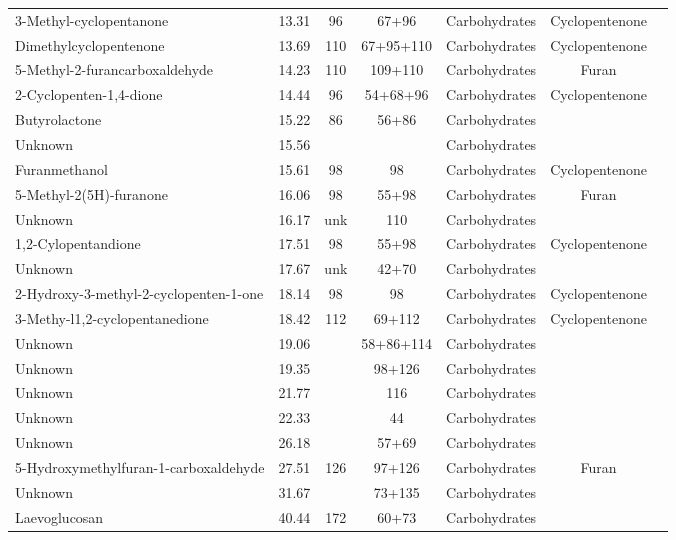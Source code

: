 \begin{table}[h!]
\begin{center}
{\begin{tabular}{lcccccc}
3-Methyl-cyclopentanone & 13.31 & 96 & 67+96 &Carbohydrates&Cyclopentenone\\ 
Dimethylcyclopentenone & 13.69 & 110 & 67+95+110 &Carbohydrates&Cyclopentenone\\ 
5-Methyl-2-furancarboxaldehyde & 14.23 & 110 & 109+110 &Carbohydrates&Furan\\ 
2-Cyclopenten-1,4-dione & 14.44 & 96 & 54+68+96 &Carbohydrates&Cyclopentenone\\ 
Butyrolactone & 15.22 & 86 & 56+86 &Carbohydrates& \\ 
Unknown & 15.56 &  &  &Carbohydrates&  \\ 
Furanmethanol & 15.61 & 98 & 98 &Carbohydrates&Cyclopentenone\\ 
5-Methyl-2(5H)-furanone & 16.06 & 98 & 55+98 &Carbohydrates&Furan\\ 
Unknown & 16.17 & unk & 110 &Carbohydrates&  \\ 
1,2-Cylopentandione & 17.51 & 98 & 55+98 &Carbohydrates&Cyclopentenone\\ 
Unknown & 17.67 & unk & 42+70 &Carbohydrates&  \\ 
2-Hydroxy-3-methyl-2-cyclopenten-1-one & 18.14 & 98 & 98 &Carbohydrates&Cyclopentenone\\ 
3-Methy-l1,2-cyclopentanedione & 18.42 & 112 & 69+112 &Carbohydrates&Cyclopentenone\\ 
Unknown & 19.06 && 58+86+114 &Carbohydrates&\\ 
Unknown & 19.35 && 98+126 &Carbohydrates&\\ 
Unknown & 21.77 && 116 &Carbohydrates&\\ 
Unknown & 22.33 && 44 &Carbohydrates&\\ 
Unknown & 26.18 && 57+69 &Carbohydrates&\\ 
5-Hydroxymethylfuran-1-carboxaldehyde & 27.51 & 126 & 97+126 &Carbohydrates&Furan\\ 
Unknown & 31.67 && 73+135 &Carbohydrates&\\ 
Laevoglucosan & 40.44 & 172 & 60+73 &Carbohydrates& \\ 
   \hline
\end{tabular}
}
\end{center}
\end{table}


